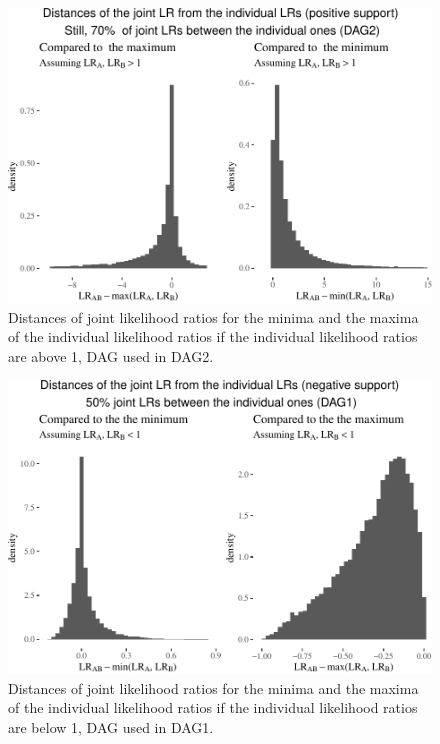 \documentclass[
  10pt,
  dvipsnames,enabledeprecatedfontcommands]{scrartcl}
\begin{document}
\begin{figure}


\begin{center}\includegraphics[width=1\linewidth]{conjunction-appendix14_files/figure-latex/unnamed-chunk-23-1} \end{center}

\caption{Distances of joint likelihood ratios for the minima and the maxima of the individual likelihood ratios if the individual likelihood ratios are above 1, DAG used in \textsf{DAG2}.}
\label{fig:LRabovePlotDep}
\end{figure}

\begin{figure}


\begin{center}\includegraphics[width=1\linewidth]{conjunction-appendix14_files/figure-latex/unnamed-chunk-24-1} \end{center}

\caption{Distances of joint likelihood ratios for the minima and the maxima of the individual likelihood ratios if the individual likelihood ratios are below 1, DAG used in \textsf{DAG1}.} 
\label{fig:LRlowerPlot}
\end{figure}
\end{document}

